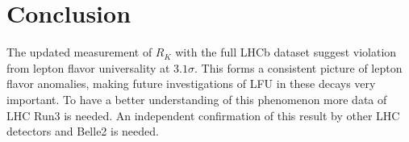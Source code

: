 \section{Conclusion}
The updated measurement of $R_K$ with the full LHCb dataset 
suggest violation from lepton flavor universality at $3.1\sigma$.
This forms a consistent picture of lepton flavor anomalies,
making future investigations of LFU in these decays very important.
To have a better understanding of this phenomenon more data of 
LHC Run3 is needed.
An independent confirmation of this result by other LHC detectors and 
Belle2 is needed.
